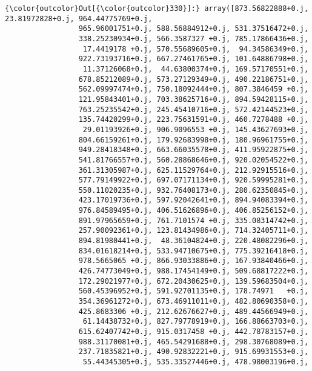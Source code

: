 \documentclass[11pt]{article}
\begin{document}
\begin{Verbatim}[commandchars=\\\{\}]
{\color{outcolor}Out[{\color{outcolor}330}]:} array([873.56822888+0.j,  23.81972828+0.j, 964.44775769+0.j,
                 965.96001751+0.j, 588.56884912+0.j, 531.37516472+0.j,
                 338.25230934+0.j, 566.3587327 +0.j, 785.17866436+0.j,
                  17.4419178 +0.j, 570.55689605+0.j,  94.34586349+0.j,
                 922.73193716+0.j, 667.27461765+0.j, 101.64886798+0.j,
                  11.37126068+0.j,  44.63800374+0.j, 169.57170551+0.j,
                 678.85212089+0.j, 573.27129349+0.j, 490.22186751+0.j,
                 562.09997474+0.j, 750.18092444+0.j, 807.3846459 +0.j,
                 121.95843401+0.j, 703.38625716+0.j, 894.59428115+0.j,
                 763.25235542+0.j, 245.45410716+0.j, 572.42144523+0.j,
                 135.74420299+0.j, 223.75631591+0.j, 460.7278488 +0.j,
                  29.01193926+0.j, 906.9096553 +0.j, 145.43627693+0.j,
                 804.66159261+0.j, 179.92683998+0.j, 180.96961755+0.j,
                 949.28418348+0.j, 663.66035578+0.j, 411.95922875+0.j,
                 541.81766557+0.j, 560.28868646+0.j, 920.02054522+0.j,
                 361.31305987+0.j, 625.11529764+0.j, 212.92915516+0.j,
                 577.79149922+0.j, 697.07171134+0.j, 920.59995281+0.j,
                 550.11020235+0.j, 932.76408173+0.j, 280.62350845+0.j,
                 423.17019736+0.j, 597.92042641+0.j, 894.94083394+0.j,
                 976.84589495+0.j, 406.51626896+0.j, 406.85256152+0.j,
                 891.97965659+0.j, 761.7101574 +0.j, 335.08314742+0.j,
                 257.90092361+0.j, 123.81434986+0.j, 714.32405711+0.j,
                 894.81980441+0.j,  48.36104824+0.j, 220.48082296+0.j,
                 834.01618214+0.j, 533.94710675+0.j, 775.39216418+0.j,
                 978.5665065 +0.j, 866.93033886+0.j, 167.93840466+0.j,
                 426.74773049+0.j, 988.17454149+0.j, 509.68817222+0.j,
                 172.29021977+0.j, 672.20430625+0.j, 139.59683504+0.j,
                 560.45396952+0.j, 591.92701135+0.j, 178.74971   +0.j,
                 354.36961272+0.j, 673.46911011+0.j, 482.80690358+0.j,
                 425.8683306 +0.j, 212.62676627+0.j, 489.44566949+0.j,
                  61.14438732+0.j, 827.79778919+0.j, 166.88663703+0.j,
                 615.62407742+0.j, 915.0317458 +0.j, 442.78783157+0.j,
                 988.31170081+0.j, 465.54291688+0.j, 298.30768089+0.j,
                 237.71835821+0.j, 490.92832221+0.j, 915.69931553+0.j,
                  55.44345305+0.j, 535.33527446+0.j, 478.98003196+0.j,

\end{Verbatim}
\end{document}
